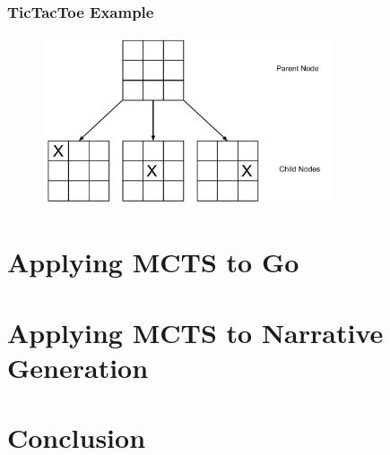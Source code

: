\documentclass{beamer}
\begin{document}
\begin{frame}
\frametitle{TicTacToe Example}
\begin{figure}[h]
	\includegraphics[width=8.5cm]{Diagrams/TicTacToeTree.pdf}
	\centering
\end{figure}
\end{frame}

\section{Applying MCTS to Go}

\section{Applying MCTS to Narrative Generation}

\section{Conclusion} 
\end{document}
